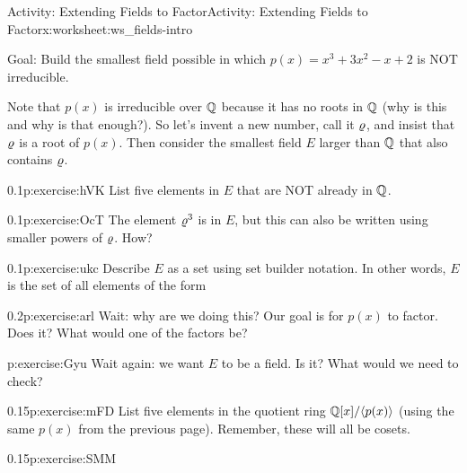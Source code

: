 \documentclass[11pt]{book}
\begin{document}
%
%
\typeout{************************************************}
\typeout{************************************************}
%
\begin{worksheet-subsection-numberless}{Activity: Extending Fields to Factor}{}{Activity: Extending Fields to Factor}{}{}{x:worksheet:ws_fields-intro}
\begin{introduction}{}%
Goal: Build the smallest field possible in which \(p(x) = x^3 + 3x^2 - x + 2\) is NOT irreducible.%
\par
Note that \(p(x)\) is irreducible over \(\mathbb{Q}\) because it has no roots in \(\mathbb{Q}\) (why is this and why is that enough?).  So let's invent a new number, call it \(\varrho\), and insist that \(\varrho\) is a root of \(p(x)\).  Then consider the smallest field \(E\) larger than \(\mathbb{Q}\) that also contains \(\varrho\).%
\end{introduction}%
\begin{divisionexercise}{1}{}{0.1}{p:exercise:hVK}%
List five elements in \(E\) that are NOT already in \(\mathbb{Q}\).%
\end{divisionexercise}%
\begin{divisionexercise}{2}{}{0.1}{p:exercise:OcT}%
The element \(\varrho^3\) is in \(E\), but this can also be written using smaller powers of \(\varrho\).  How?%
\end{divisionexercise}%
\begin{divisionexercise}{3}{}{0.1}{p:exercise:ukc}%
Describe \(E\) as a set using set builder notation.  In other words, \(E\) is the set of all elements of the form \textellipsis{}%
\end{divisionexercise}%
\begin{divisionexercise}{4}{}{0.2}{p:exercise:arl}%
Wait: why are we doing this?  Our goal is for \(p(x)\) to factor.  Does it?  What would one of the factors be?%
\end{divisionexercise}%
\begin{divisionexercise}{5}{}{}{p:exercise:Gyu}%
Wait again: we want \(E\) to be a field.  Is it?  What would we need to check?%
\end{divisionexercise}%
\clearpage
\begin{divisionexercise}{6}{}{0.15}{p:exercise:mFD}%
List five elements in the quotient ring \(\mathbb{Q}[x]/\langle p(x)\rangle\) (using the same \(p(x)\) from the previous page).  Remember, these will all be cosets.%
\end{divisionexercise}%
\begin{divisionexercise}{7}{}{0.15}{p:exercise:SMM}%

\end{divisionexercise}
\end{worksheet-subsection-numberless}
\end{document}
